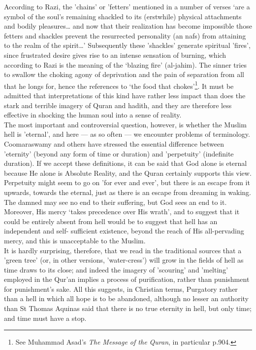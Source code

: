 \documentclass[10pt, twoside,openright]{book}
\begin{document}
According to Razi, the 'chains' or 'fetters' mentioned in a number of verses `are a symbol of the 
soul's remaining shackled to its (erstwhile) physical attachments and bodily pleasures\ldots{} and now 
that their realization has become impossible those fetters and shackles prevent the resurrected 
personality (an nafs) from attaining to the realm of the spirit\ldots{}' Subsequently these 'shackles' 
generate spiritual 'fires', since frustrated desire gives rise to an intense sensation of burning, 
which according to Razi is the meaning of the `blazing fire' (al\hyp{}jahim). The sinner tries to swallow 
the choking agony of deprivation and the pain of separation from all that he longs for, hence the 
references to `the food that chokes'\footnote{See Muhammad Asad's \emph{The Message of the Quran}, in particular p.904.}. It must be admitted that interpretations of this kind have 
rather less impact than does the stark and terrible imagery of Quran and hadith, and they are 
therefore less effective in shocking the human soul into a sense of reality. \\

The most important and controversial question, however, is whether the Muslim hell is 'eternal', and 
here --- as so often --- we encounter problems of terminology. Coomaraswamy and others have stressed the 
essential difference between 'eternity' (beyond any form of time or duration) and 'perpetuity' 
(indefinite duration). If we accept these definitions, it can be said that God alone is eternal 
because He alone is Absolute Reality, and the Quran certainly supports this view. Perpetuity might 
seem to go on 'for ever and ever', but there is an escape from it upwards, towards the eternal, just 
as there is an escape from dreaming in waking. The damned may see no end to their suffering, but God 
sees an end to it. Moreover, His mercy `takes precedence over His wrath', and to suggest that it 
could be entirely absent from hell would be to suggest that hell has an independent and self\hyp{}
sufficient existence, beyond the reach of His all\hyp{}pervading mercy, and this is unacceptable to the 
Muslim. \\



It is hardly surprising, therefore, that we read in the traditional sources that a 'green tree' (or, 
in other versions, 'water\hyp{}cress') will grow in the fields of hell as time draws to its close; and 
indeed the imagery of 'scouring' and 'melting' employed in the Qur'an implies a process of 
purification, rather than punishment for punishment's sake. All this suggests, in Christian terms, 
Purgatory rather than a hell in which all hope is to be abandoned, although no lesser an authority 
than St Thomas Aquinas said that there is no true eternity in hell, but only time; and time must have 
a stop. \\
\end{document}
